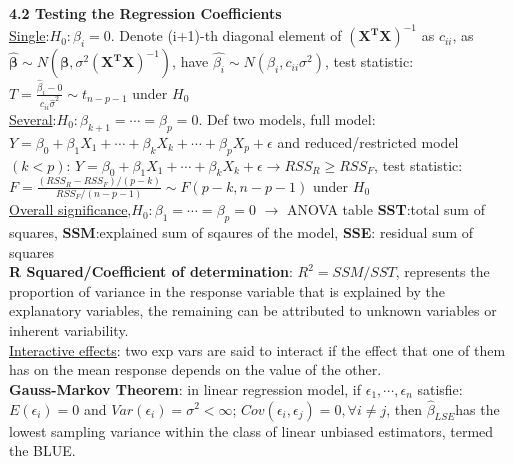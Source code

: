 \documentclass[10pt,a4paper,landscape]{article}
\begin{document}
\begin{multicols}{3}
{\textbf{4.2 Testing the Regression Coefficients}\\
\underline{Single}:$H_0:\beta_i=0$. Denote (i+1)-th diagonal element of $\boldsymbol{(X^TX)}^{-1}$ as $c_{ii}$, as $\hat{\boldsymbol{\beta}}\sim N(\boldsymbol{\beta},\sigma^2 (\boldsymbol{X^TX})^{-1})$, have $\hat{\beta_i}\sim N(\beta_i, c_{ii}\sigma^2)$, test statistic: $T=\frac{\hat{\beta}_i-0 }{c_{ii}\hat{\sigma }^2}\sim t_{n-p-1} $ under $H_0$\\
\underline{Several}:$H_0:\beta_{k+1}=\cdots=\beta_p=0$. Def two models, full model: $Y=\beta_0+\beta_1X_1+\cdots+\beta_kX_k+\cdots+\beta_pX_p+\epsilon$ and reduced/restricted model$(k<p)$: $Y=\beta_0+\beta_1X_1+\cdots+\beta_kX_k+\epsilon$$\rightarrow$$RSS_R\geq RSS_F$, test statistic: $F=\frac{(RSS_R-RSS_F)/(p-k)}{RSS_F/(n-p-1)} \sim F(p-k,n-p-1)$ under $H_0$\\
\underline{Overall significance},$H_0:\beta_1=\cdots=\beta_p=0$ $\rightarrow$ ANOVA table
\textbf{SST}:total sum of squares, \textbf{SSM}:explained sum of sqaures of the model, \textbf{SSE}: residual sum of squares\\
\textbf{R Squared/Coefficient of determination}: $R^2=SSM/SST$, represents the proportion of variance in the response variable that is explained by the explanatory variables, the remaining can be attributed to unknown variables or inherent variability.\\
\underline{Interactive effects}: two exp vars are said to interact if the effect that one of them has on the mean response depends on the value of the other.\\
\textbf{Gauss-Markov Theorem}: in linear regression model, if $\epsilon_1,\cdots,\epsilon_n$ satisfie:$E(\epsilon_i)=0$ and $Var(\epsilon_i)=\sigma^2<\infty$; $Cov(\epsilon_i,\epsilon_j)=0,\forall i\neq j$, then $\hat{\beta}_{LSE}$has the lowest sampling
variance within the class of linear unbiased estimators, termed the BLUE.\\




}
\end{multicols}
\end{document}
